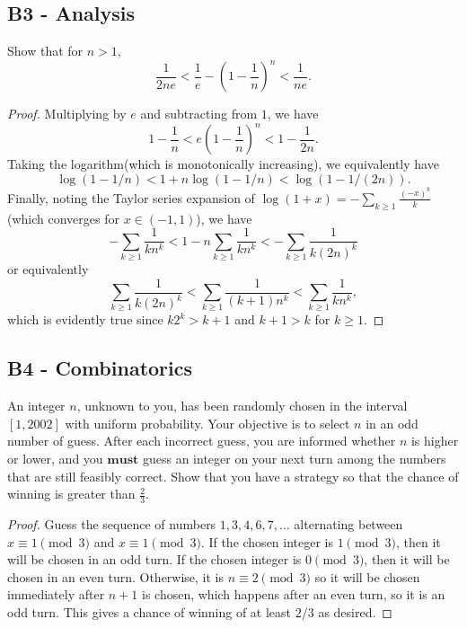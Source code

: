 \documentclass[11pt]{scrartcl}
\newcommand{\<}{\langle}
\renewcommand{\>}{\rangle}
\begin{document}
\subsection{B3 - Analysis}
Show that for $n > 1$,
$$\frac{1}{2ne} < \frac{1}{e} - \left( 1 - \frac{1}{n} \right)^n < \frac{1}{ne}. $$
\begin{proof}
Multiplying by $e$ and subtracting from $1$, we have 
$$1 - \frac{1}{n} < e \left(1 - \frac{1}{n}\right)^n < 1 - \frac{1}{2n}.$$
Taking the logarithm(which is monotonically increasing), we equivalently have
$$\log(1 - 1/n) < 1 + n\log(1 - 1/n) < \log(1- 1/(2n)).$$
Finally, noting the Taylor series expansion of $\log(1 + x) = -\sum_{k \ge 1} \frac{(-x)^k}{k}$(which converges for $x \in (-1, 1)$), we have
$$-\sum_{k \ge 1} \frac{1}{kn^k}< 1 - n\sum_{k \ge 1} \frac{1}{kn^k} < -\sum_{k \ge 1} \frac{1}{k(2n)^k}$$
or equivalently
$$\sum_{k\ge 1}\frac{1}{k(2n)^k} < \sum_{k \ge 1} \frac{1}{(k + 1)n^k} <\sum_{k \ge 1} \frac{1}{kn^k},$$
which is evidently true since $k2^k > k + 1$ and $k+1 > k$ for $k \ge 1$.
\end{proof}
\subsection{B4 - Combinatorics}
An integer $n$, unknown to you, has been randomly chosen in the interval $[1,2002]$ with uniform probability. Your objective is to select $n$ in an odd number of guess. After each incorrect guess, you are informed whether $n$ is higher or lower, and you $\textbf{must}$ guess an integer on your next turn among the numbers that are still feasibly correct. Show that you have a strategy so that the chance of winning is greater than $\tfrac{2}{3}$.

\begin{proof}
Guess the sequence of numbers $1, 3, 4, 6, 7, \dots$ alternating between $x \equiv 1 \pmod{3}$ and $x \equiv 1 \pmod{3}$.  If the chosen integer is  $1 \pmod{3}$, then it will be chosen in an odd turn.  If the chosen integer is $0 \pmod{3}$, then it will be chosen in an even turn.  Otherwise, it is $n \equiv 2 \pmod{3}$ so it will be chosen immediately after $n+1$ is chosen, which happens after an even turn, so it is an odd turn.  This gives a chance of winning of at least $2/3$ as desired.  
\end{proof}
\end{document}
